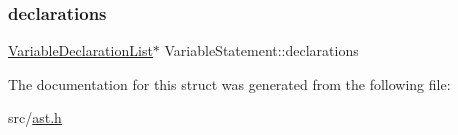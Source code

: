 \subsubsection{\texorpdfstring{declarations}{declarations}}
{\footnotesize\ttfamily \hyperlink{struct_variable_declaration_list}{Variable\+Declaration\+List}$\ast$ Variable\+Statement\+::declarations}



The documentation for this struct was generated from the following file\+:\begin{DoxyCompactItemize}
\item 
src/\hyperlink{ast_8h}{ast.\+h}\end{DoxyCompactItemize}
